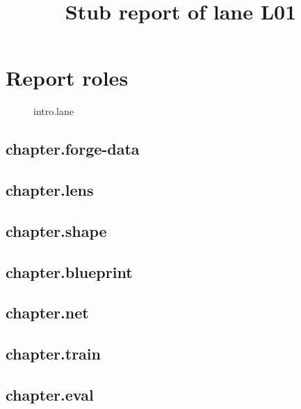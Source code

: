 \documentclass{report}
\begin{document}
\title{Stub report of lane L01}
\maketitle
\setcounter{chapter}{2}
\chapter{Report roles}
\begin{figure}\caption{intro.lane}\label{vega:intro.lane}\end{figure}
\section{chapter.forge-data}\label{vega:chapter.forge-data}
\section{chapter.lens}\label{vega:chapter.lens}
\section{chapter.shape}\label{vega:chapter.shape}
\section{chapter.blueprint}\label{vega:chapter.blueprint}
\section{chapter.net}\label{vega:chapter.net}
\section{chapter.train}\label{vega:chapter.train}
\section{chapter.eval}\label{vega:chapter.eval}
\end{document}
